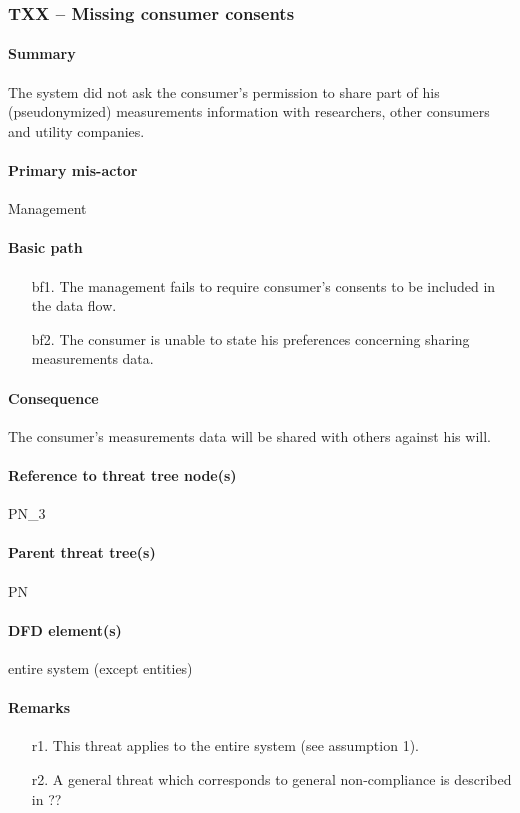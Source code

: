 \subsubsection{TXX -- Missing consumer consents} %
\paragraph{Summary} The system did not ask the consumer's permission to share
part of his (pseudonymized) measurements information with researchers, other
consumers and utility companies.

\paragraph{Primary mis-actor} Management

\paragraph{Basic path}
\begin{enumerate}
	\item[bf1.] The management fails to require consumer's consents to be included
	in the data flow.
	\item[bf2.] The consumer is unable to state his preferences concerning sharing
	measurements data.
\end{enumerate}

\paragraph{Consequence} The consumer's measurements data will be shared with
others against his will. 

\paragraph{Reference to threat tree node(s)} PN_3

\paragraph{Parent threat tree(s)} PN

\paragraph{DFD element(s)} entire system (except entities)

\paragraph{Remarks}
\begin{enumerate}
     \item[r1.] This threat applies to the entire system (see assumption 1).
     \item[r2.] A general threat which corresponds to general non-compliance is
     described in ?? %
\end{enumerate}
